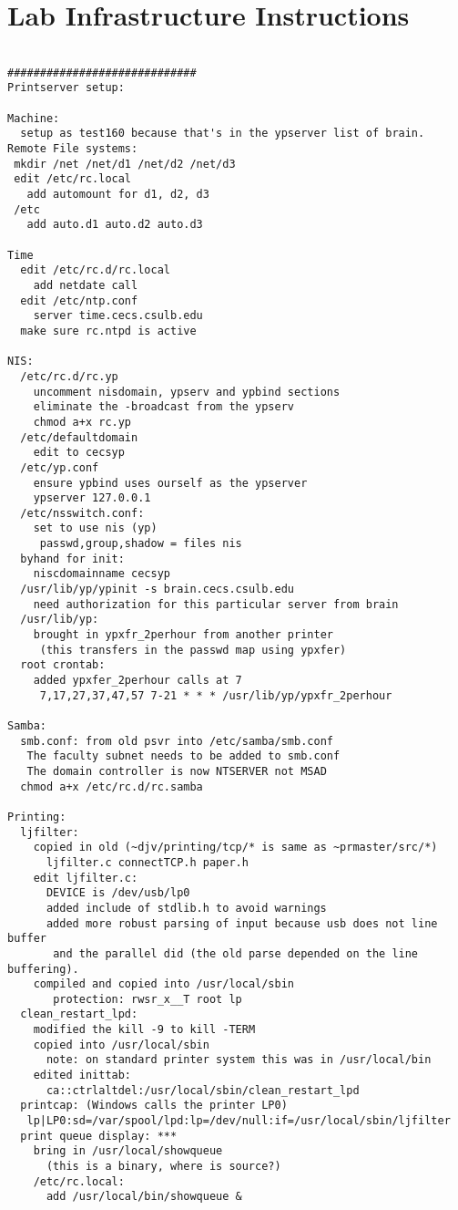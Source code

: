\chapter{Lab Infrastructure Instructions} \label{lab_infrastructure_instructions}

\begin{verbatim}

#############################
Printserver setup:

Machine:
  setup as test160 because that's in the ypserver list of brain.
Remote File systems:
 mkdir /net /net/d1 /net/d2 /net/d3
 edit /etc/rc.local
   add automount for d1, d2, d3
 /etc
   add auto.d1 auto.d2 auto.d3

Time
  edit /etc/rc.d/rc.local
    add netdate call
  edit /etc/ntp.conf
    server time.cecs.csulb.edu
  make sure rc.ntpd is active

NIS:
  /etc/rc.d/rc.yp
    uncomment nisdomain, ypserv and ypbind sections
    eliminate the -broadcast from the ypserv
    chmod a+x rc.yp
  /etc/defaultdomain
    edit to cecsyp
  /etc/yp.conf
    ensure ypbind uses ourself as the ypserver
    ypserver 127.0.0.1
  /etc/nsswitch.conf:
    set to use nis (yp)
     passwd,group,shadow = files nis
  byhand for init:
    niscdomainname cecsyp
  /usr/lib/yp/ypinit -s brain.cecs.csulb.edu
    need authorization for this particular server from brain
  /usr/lib/yp:
    brought in ypxfr_2perhour from another printer
     (this transfers in the passwd map using ypxfer)
  root crontab:
    added ypxfer_2perhour calls at 7
     7,17,27,37,47,57 7-21 * * * /usr/lib/yp/ypxfr_2perhour

Samba:
  smb.conf: from old psvr into /etc/samba/smb.conf
   The faculty subnet needs to be added to smb.conf
   The domain controller is now NTSERVER not MSAD
  chmod a+x /etc/rc.d/rc.samba

Printing:
  ljfilter:
    copied in old (~djv/printing/tcp/* is same as ~prmaster/src/*)
      ljfilter.c connectTCP.h paper.h
    edit ljfilter.c:
      DEVICE is /dev/usb/lp0
      added include of stdlib.h to avoid warnings
      added more robust parsing of input because usb does not line buffer
       and the parallel did (the old parse depended on the line buffering).
    compiled and copied into /usr/local/sbin
       protection: rwsr_x__T root lp
  clean_restart_lpd:
    modified the kill -9 to kill -TERM
    copied into /usr/local/sbin
      note: on standard printer system this was in /usr/local/bin
    edited inittab:
      ca::ctrlaltdel:/usr/local/sbin/clean_restart_lpd
  printcap: (Windows calls the printer LP0)
   lp|LP0:sd=/var/spool/lpd:lp=/dev/null:if=/usr/local/sbin/ljfilter
  print queue display: ***
    bring in /usr/local/showqueue
      (this is a binary, where is source?)
    /etc/rc.local:
      add /usr/local/bin/showqueue &


\end{verbatim}
